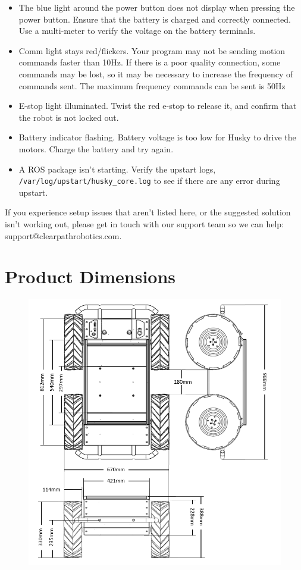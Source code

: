 \documentclass[]{clearpath-latex/clearpath-manual}
\begin{document}
\begin{itemize}
	\item The blue light around the power button does not display when pressing the power button. Ensure that the battery is charged and correctly connected. Use a multi-meter to verify the voltage on the battery terminals.
	\item Comm light stays red/flickers. Your program may not be sending motion commands faster than 10Hz. If there is a poor quality connection, some commands may be lost, so it may be necessary to increase the frequency of commands sent. The maximum frequency commands can be sent is 50Hz
	\item E-stop light illuminated. Twist the red e-stop to release it, and confirm that the robot is not locked out.
	\item Battery indicator flashing. Battery voltage is too low for Husky to drive the motors. Charge the battery and try again.
	\item A ROS package isn't starting. Verify the upstart logs, \lstinline{/var/log/upstart/husky_core.log} to see if there are any error during upstart.
\end{itemize}
	
If you experience setup issues that aren’t listed here, or the suggested solution isn’t working out, please get in touch with our support team so we can help: support@clearpathrobotics.com.

\newpage
\section{Product Dimensions}

\begin{figure}[h]
	\centering
	\includegraphics[width=.9\textwidth]{husky-dimensions.png}
\end{figure}
\newpage
\end{document}
